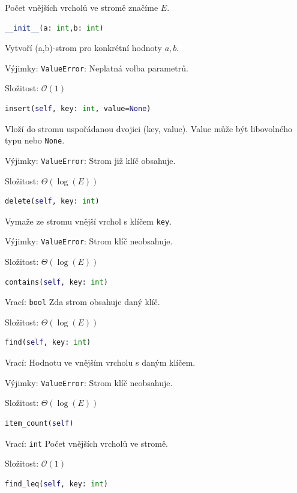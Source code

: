 \documentclass[a4paper,11pt,openany]{article}
\begin{document}
Počet vnějších vrcholů ve stromě značíme $E$.
	
\begin{lstlisting}[language=python,frame=none]
__init__(a: int,b: int)
\end{lstlisting}
Vytvoří (a,b)-strom pro konkrétní hodnoty $a,b$.
	
Výjimky: \texttt{ValueError}: Neplatná volba parametrů.
	
Složitost: $\mathcal{O}(1)$
\begin{lstlisting}[language=python,frame=none]
insert(self, key: int, value=None)
\end{lstlisting}
Vloží do stromu uspořádanou dvojici (key, value). Value může být libovolného typu nebo \texttt{None}.
	
Výjimky: \texttt{ValueError}: Strom již klíč obsahuje.
	
Složitost: $\Theta(\log(E))$
	
\begin{lstlisting}[language=python,frame=none]
delete(self, key: int)
\end{lstlisting}
Vymaže ze stromu vnější vrchol s klíčem \texttt{key}.
	
Výjimky: \texttt{ValueError}: Strom klíč neobsahuje.

Složitost: $\Theta(\log(E))$

\begin{lstlisting}[language=python,frame=none]
contains(self, key: int)
\end{lstlisting}
	
Vrací: \texttt{bool} Zda strom obsahuje daný klíč.

Složitost: $\Theta(\log(E))$
	
\begin{lstlisting}[language=python,frame=none]
find(self, key: int)
\end{lstlisting}
	
Vrací: Hodnotu ve vnějším vrcholu s daným klíčem.
	
Výjimky: \texttt{ValueError}: Strom klíč neobsahuje.
	
Složitost: $\Theta(\log(E))$
	
\begin{lstlisting}[language=python,frame=none]
item_count(self)
\end{lstlisting}
	
Vrací: \texttt{int} Počet vnějších vrcholů ve stromě.
	
Složitost: $\mathcal{O}(1)$
	
\begin{lstlisting}[language=python,frame=none]
find_leq(self, key: int)
\end{lstlisting}
	
\end{document}
